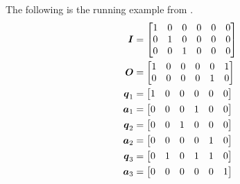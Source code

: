 The following is the running example from \cite{TCC:McQSwoRos19}.
\begin{align*}
\boldsymbol{I}    &= \begin{bmatrix}
            1 & 0 & 0 & 0 & 0 & 0 \\
            0 & 1 & 0 & 0 & 0 & 0 \\
            0 & 0 & 1 & 0 & 0 & 0 
            \end{bmatrix} \\
\boldsymbol{O}    &= \begin{bmatrix}
            1 & 0 & 0 & 0 & 0 & 1 \\
            0 & 0 & 0 & 0 & 1 & 0 
            \end{bmatrix} \\
\boldsymbol q_1 &= \begin{bmatrix}1 & 0 & 0 & 0 & 0 & 0\end{bmatrix} \\
\boldsymbol a_1 &= \begin{bmatrix}0 & 0 & 0 & 1 & 0 & 0\end{bmatrix} \\
\boldsymbol q_2 &= \begin{bmatrix}0 & 0 & 1 & 0 & 0 & 0\end{bmatrix} \\
\boldsymbol a_2 &= \begin{bmatrix}0 & 0 & 0 & 0 & 1 & 0\end{bmatrix} \\
\boldsymbol q_3 &= \begin{bmatrix}0 & 1 & 0 & 1 & 1 & 0\end{bmatrix} \\
\boldsymbol a_3 &= \begin{bmatrix}0 & 0 & 0 & 0 & 0 & 1\end{bmatrix} \\
\end{align*}

